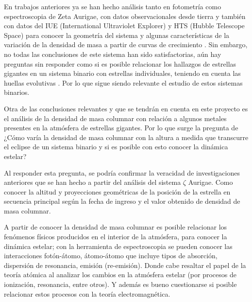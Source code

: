 \documentclass[12pt,oneside,openany,letter]{book}
\begin{document}
\noindent En trabajos anteriores ya se han hecho análisis tanto en fotometría como espectroscopia de Zeta Aurigae, con datos observacionales desde tierra y también con datos del IUE (International Ultraviolet Explorer) y HTS (Hubble Telescope Space) para conocer la geometría del sistema \citep{kps9} y algunas características de la variación de la densidad de masa \citep{kps1O} a partir de curvas de crecimiento \citep{complete}. Sin embargo, no todas las conclusiones de este sistema han sido satisfactorias, aún hay preguntas sin responder como si es posible relacionar los hallazgos de estrellas gigantes en un sistema binario con estrellas individuales, teniendo en cuenta las huellas evolutivas \citep{schroder1997critical}. Por lo que sigue siendo relevante el estudio de estos sistemas binarios.

\noindent Otra de las conclusiones relevantes y que se tendrán en cuenta en este proyecto es el análisis de la densidad de masa columnar con relación a algunos metales presentes en la atmósfera de estrellas gigantes. Por lo que surge la pregunta de ¿Cómo varía la densidad de masa columnar con la altura a medida que transcurre el eclipse de un sistema binario y si es posible con esto conocer la dinámica estelar? 


\noindent Al responder esta pregunta, se podría confirmar la veracidad de investigaciones anteriores que se han hecho a partir del análisis del sistema $\zeta$ Aurigae. Como conocer la altitud  y proyecciones geométricas de la posición de la estrella en secuencia principal según la fecha de ingreso y el valor obtenido de densidad de masa columnar.
\vspace{2mm}

\noindent A partir de conocer la densidad de masa columnar es posible relacionar los fenómenos físicos producidos en el interior de la atmósfera, para conocer la dinámica estelar; con la herramienta de espectroscopia se pueden conocer las interacciones fotón-átomo, átomo-átomo que incluye tipos de absorción, dispersión de resonancia, emisión (re-emisión). Donde cabe resaltar el papel de la teoría atómica al analizar los cambios en la atmósfera estelar (por procesos de ionización, resonancia, entre otros). Y además es bueno cuestionarse si posible relacionar estos procesos con la teoría electromagnética.
\end{document}
